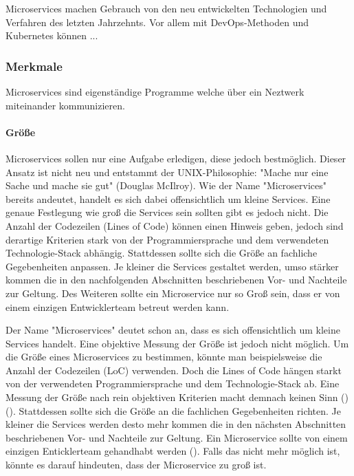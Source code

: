 Microservices machen Gebrauch von den neu entwickelten Technologien und Verfahren des letzten Jahrzehnts. Vor allem mit DevOps-Methoden und Kubernetes können ...

\subsubsection{Merkmale}

Microservices sind eigenständige Programme welche über ein Neztwerk miteinander kommunizieren.

\paragraph{Größe}

Microservices sollen nur eine Aufgabe erledigen, diese jedoch bestmöglich. Dieser Ansatz ist nicht neu und entstammt der UNIX-Philosophie: "Mache nur eine Sache und mache sie gut" (Douglas McIlroy).
Wie der Name "Microservices" bereits andeutet, handelt es sich dabei offensichtlich um kleine Services. Eine genaue Festlegung wie groß die Services sein sollten gibt es jedoch nicht. Die Anzahl der Codezeilen (Lines of Code) können einen Hinweis geben, jedoch sind derartige Kriterien stark von der Programmiersprache und dem verwendeten Technologie-Stack abhängig. Stattdessen sollte sich die Größe an fachliche Gegebenheiten anpassen. Je kleiner die Services gestaltet werden, umso stärker kommen die in den nachfolgenden Abschnitten beschriebenen Vor- und Nachteile zur Geltung. Des Weiteren sollte ein Microservice nur so Groß sein, dass er von einem einzigen Entwicklerteam betreut werden kann.

Der Name "Microservices" deutet schon an, dass es sich offensichtlich um kleine Services handelt.
Eine objektive Messung der Größe ist jedoch nicht möglich. Um die Größe eines Microservices zu bestimmen, könnte man beispielsweise die Anzahl der Codezeilen (LoC) verwenden. Doch die Lines of Code hängen starkt von der verwendeten Programmiersprache und dem Technologie-Stack ab. Eine Messung der Größe nach rein objektiven Kriterien macht demnach keinen Sinn (\cite[S. 31]{wolffMicroservices2018})(\cite[S. 22]{newmanMicroservices2015}). Stattdessen sollte sich die Größe an die fachlichen Gegebenheiten richten. Je kleiner die Services werden desto mehr kommen die in den nächsten Abschnitten beschriebenen Vor- und Nachteile zur Geltung. Ein Microservice sollte von einem einzigen Enticklerteam gehandhabt werden (\cite[S. 23]{newmanMicroservices2015}). Falls das nicht mehr möglich ist, könnte es darauf hindeuten, dass der Microservice zu groß ist.

